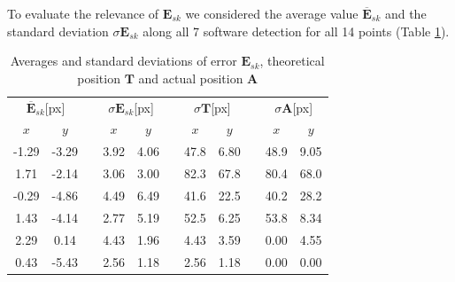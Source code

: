 \documentclass[a4paper, 10 pt, conference]{ieeeconf}      %
\begin{document}
To evaluate the relevance of $\mathbf{E}_{sk}$ we considered the average value $\overline{\mathbf{E}}_{sk}$ and the standard deviation $\sigma{\mathbf{E}}_{sk}$ along all 7 software detection for all 14 points (Table \ref{tab:dev}).
\begin{table}[h!]
	\centering
	\caption{Averages and standard deviations of error $\mathbf{E}_{sk}$, theoretical position $\mathbf{T}$ and actual position $\mathbf{A}$}
	\label{tab:dev}
	\begin{adjustbox}{max width=\textwidth}
		\begin{tabular}{@{}ccccclccccc@{}}
			\toprule
			\multicolumn{2}{c}{$\overline{\mathbf{E}}_{sk}$[px]} &  & \multicolumn{2}{c}{$\sigma{\mathbf{E}}_{sk}$[px]} &  & \multicolumn{2}{c}{$\sigma\mathbf{T}${[px]}} &  & \multicolumn{2}{c}{$\sigma\mathbf{A}${[px]}} \\ \cmidrule(r){1-2} \cmidrule(lr){4-5} \cmidrule(lr){7-8} \cmidrule(l){10-11} 
			$x$                     & $y$                    &  & $x$                   & $y$                   &  & $x$                    & $y$                   &  & $x$                    & $y$                   \\ \midrule
			-1.29                   & -3.29                  &  & 3.92                  & 4.06                  &  & 47.8                   & 6.80                  &  & 48.9                   & 9.05                  \\
			1.71                    & -2.14                  &  & 3.06                  & 3.00                  &  & 82.3                   & 67.8                  &  & 80.4                   & 68.0                  \\
			-0.29                   & -4.86                  &  & 4.49                  & 6.49                  &  & 41.6                   & 22.5                  &  & 40.2                   & 28.2                  \\
			1.43                    & -4.14                  &  & 2.77                  & 5.19                  &  & 52.5                   & 6.25                  &  & 53.8                   & 8.34                  \\
			2.29                    & 0.14                   &  & 4.43                  & 1.96                  &  & 4.43                   & 3.59                  &  & 0.00                   & 4.55                  \\
			0.43                    & -5.43                  &  & 2.56                  & 1.18                  &  & 2.56                   & 1.18                  &  & 0.00                   & 0.00                  \\

\end{tabular}
\end{adjustbox}
\end{table}
\end{document}
